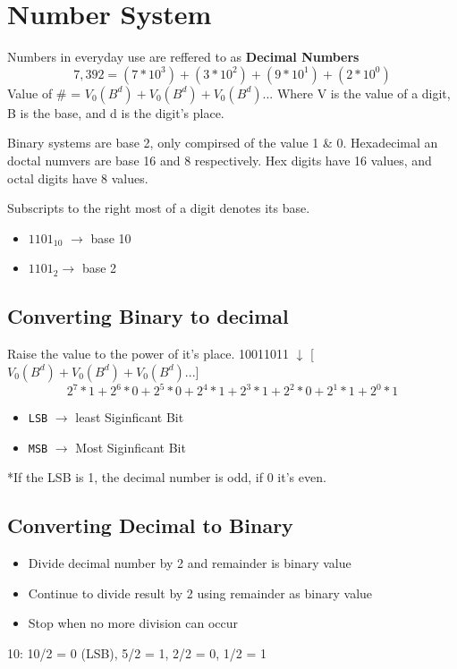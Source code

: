 \documentclass[a4paper,12pt]{article}
\begin{document}
        \section*{Number System}
        Numbers in everyday use are reffered to as \textbf{Decimal Numbers}
        \[7,392=(7*10^3)+(3*10^2)+(9*10^1)+(2*10^0)\]
        Value of \# = $V_0(B^d)+V_0(B^d)+V_0(B^d)...$ Where V is the value of a digit, B is the base, and d is the digit's place.\par 
        Binary systems are base 2, only compirsed of the value 1 \& 0. Hexadecimal an doctal numvers are base 16 and 8 respectively. Hex digits have 16 values, and octal digits have 8 values. \par
        Subscripts to the right most of a digit denotes its base.
        \begin{itemize}
            \item $1101_{10}$ $\rightarrow$ base 10
            \item $1101_{2}\rightarrow$ base 2 
        \end{itemize}

        \subsection*{Converting Binary to decimal}
        Raise the value to the power of it's place.
        10011011 $\downarrow$ [$V_0(B^d)+V_0(B^d)+V_0(B^d)...$]
        \[2^7*1+2^6*0+2^5*0+2^4*1+2^3*1+2^2*0+2^1*1+2^0*1\]
        \begin{itemize}
            \item \texttt{LSB} $\rightarrow$ least Siginficant Bit
            \item \texttt{MSB} $\rightarrow$ Most Siginficant Bit
        \end{itemize}
        *If the LSB is 1, the decimal number is odd, if 0 it's even.

        \subsection*{Converting Decimal to Binary}
            \begin{itemize}
                \item Divide decimal number by 2 and remainder is binary value
                \item Continue to divide result by 2 using remainder as binary value
                \item Stop when no more division can occur
            \end{itemize}
            10: 10/2 = 0 (LSB), 5/2 = 1, 2/2 = 0, 1/2 = 1
\end{document}
